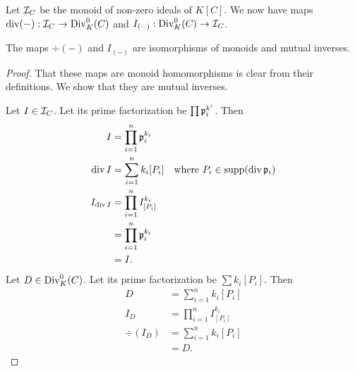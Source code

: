 Let $\cal I_C$ be the monoid of non-zero ideals of $K[C]$.
We now have maps $\div(-) : \cal I_C \to \Div_K^0(C)$ and $I_{(-)} : \Div_K^0(C) \to \cal I_C$.
\begin{theorem}
  The maps $\div(-)$ and $I_{(-)}$ are isomorphisms of monoids and mutual inverses.
\end{theorem}
\begin{proof}
  That these maps are monoid homomorphisms is clear from their definitions.
  We show that they are mutual inverses.

  Let $I \in \cal I_C$. Let its prime factorization be $\prod \frak p_i^{k^i}$. Then
  \begin{align*}
    I &= \prod_{i=1}^n \frak p_i^{k_i} \\
    \div I &= \sum_{i=1}^n k_i[P_i]
      & \text{where }P_i \in \supp(\div \frak p_i) \\
    I_{\div I} &= \prod_{i=1}^n I_{[P_i]}^{k_i} \\
               &= \prod_{i=1}^n \frak p_i^{k_i} \\
               &= I.
  \end{align*}
  Let $D \in \Div_K^0(C)$. Let its prime factorization be $\sum k_i[P_i]$. Then
  \begin{align*}
    D &= \sum_{i=1}^n k_i[P_i] \\
    I_D &= \prod_{i=1}^n I_{[P_i]}^{k_i} \\
    \div(I_D) &= \sum_{i=1}^n k_i [P_i] \\ &= D.
  \end{align*}
\end{proof}
\begin{comment}
\begin{proof}
  The proof is quite immediate after factoring each ideal.
  It has already been established that $\div$ maps the identity $K[C]$ of $\cal I_C$ to the identity $0$ of $\Div_K^0(C)$.
  Let $\frak a$ and $\frak b$ be non-zero ideals with prime factorizations
  \[ \frak a = \prod \frak p_i^{k_i}, ~~~ \frak b = \prod \frak q_i^{\ell_i}. \]
  Then
  \begin{align*}
    \div (\frak a \frak b)
      &= \div \left( \left( \prod \frak p_i^{k_i} \right) \left( \prod \frak q_j^{\ell_j} \right) \right) \\
      &= \sum k_i \div \frak p_i + \sum \ell_j \div \frak q_i \\
      &= \div \frak a + \div \frak b.
  \end{align*}
\end{proof}
\end{comment}




